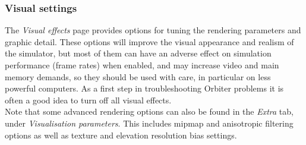 \documentclass[Orbiter User Manual.tex]{subfiles}
\begin{document}
\begin{figure}[H]
	\centering
\end{figure}

\subsubsection{Visual settings}
The \textit{Visual effects} page provides options for tuning the rendering parameters and graphic detail. These options will improve the visual appearance and realism of the simulator, but most of them can have an adverse effect on simulation performance (frame rates) when enabled, and may increase video and main memory demands, so they should be used with care, in particular on less powerful computers. As a first step in troubleshooting Orbiter problems it is often a good idea to turn off all visual effects.\\
Note that some advanced rendering options can also be found in the \textit{Extra} tab, under \textit{Visualisation parameters}. This includes mip­map and anisotropic filtering options as well as texture and elevation resolution bias settings.

\end{document}

